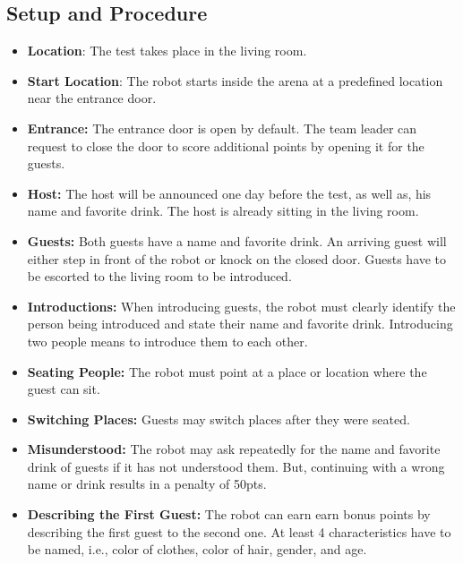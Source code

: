 \subsection*{Setup and Procedure}
\begin{itemize}
	\item \textbf{Location}: The test takes place in the living room.
	
	\item \textbf{Start Location}: The robot starts inside the arena at a predefined location near the entrance door.
	
	\item \textbf{Entrance:} The entrance door is open by default. The team leader can request to close the door to score additional points by opening it for the guests.

	\item \textbf{Host:} The host will be announced one day before the test, as well as, his name and favorite drink. The host is already sitting in the living room.

	\item \textbf{Guests:} Both guests have a name and favorite drink. An arriving guest will either step in front of the robot or knock on the closed door. Guests have to be escorted to the living room to be introduced.

	\item \textbf{Introductions:} When introducing guests, the robot must clearly identify the person being introduced and state their name and favorite drink. Introducing two people means to introduce them to each other.
	
	\item \textbf{Seating People:} The robot must point at a place or location where the guest can sit.
	
	\item \textbf{Switching Places:} Guests may switch places after they were seated.
	
	\item \textbf{Misunderstood:} The robot may ask repeatedly for the name and favorite drink of guests if it has not understood them. But, continuing with a wrong name or drink results in a penalty of 50pts.
	
	\item \textbf{Describing the First Guest:} The robot can earn earn bonus points by describing the first guest to the second one. At least 4 characteristics have to be named, i.e., color of clothes, color of hair, gender, and age.
\end{itemize}

